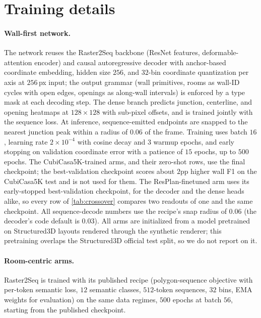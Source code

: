 \documentclass{article}
\begin{document}
\section{Training details}\label{app:train}
\paragraph{Wall-first network.} The network reuses the Raster2Seq backbone
(ResNet features, deformable-attention encoder) and causal autoregressive
decoder with anchor-based coordinate embedding, hidden size $256$, and
$32$-bin coordinate quantization per axis at $256$\,px input; the output
grammar (wall primitives, rooms as wall-ID cycles with open edges, openings
as along-wall intervals) is enforced by a type mask at each decoding step.
The dense branch predicts junction, centerline, and opening heatmaps at
$128\times128$ with sub-pixel offsets, and is trained jointly with the
sequence loss. At inference, sequence-emitted endpoints are snapped to the
nearest junction peak within a radius of $0.06$ of the frame. Training uses
batch $16$, learning rate $2\times10^{-4}$ with cosine decay and $3$ warmup
epochs, and early stopping on validation coordinate error with a patience of $15$ epochs, up to $500$ epochs. The
CubiCasa5K-trained arms, and their zero-shot rows, use the final checkpoint;
the best-validation checkpoint scores about $2$pp higher wall F1 on the
CubiCasa5K test and is not used for them. The ResPlan-finetuned arm uses its
early-stopped best-validation checkpoint, for the decoder and the dense heads
alike, so every row of \cref{tab:crossover} compares two readouts of one and
the same checkpoint. All sequence-decode numbers use the recipe's snap radius
of $0.06$ (the decoder's code default is $0.03$). All arms are initialized from a model
pretrained on Structured3D layouts rendered through the synthetic renderer;
this pretraining overlaps the Structured3D official test split, so
we do not report on it.

\paragraph{Room-centric arms.} Raster2Seq is trained with its published
recipe (polygon-sequence objective with per-token semantic loss, $12$
semantic classes, $512$-token sequences, $32$ bins, EMA weights for
evaluation) on the same data regimes, $500$ epochs at batch $56$, starting
from the published checkpoint.
\end{document}

